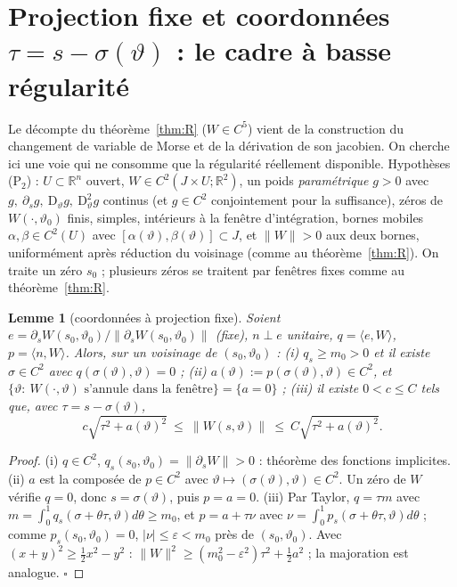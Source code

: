 \documentclass[11pt,a4paper]{article}
\newtheorem{lemme}[theoreme]{Lemme}
\theoremstyle{remark}
\newcommand{\R}{\mathbb R}
\newcommand{\vth}{\vartheta}
\newcommand{\D}{\mathrm D}
\begin{document}
\section{Projection fixe et coordonnées $\tau=s-\sigma(\vth)$ : le cadre à basse régularité}\label{sec:B}
Le décompte du théorème~\ref{thm:R} ($W\in C^5$) vient de la construction du changement de variable de Morse et de la dérivation de son jacobien. On cherche ici une voie qui ne consomme que la régularité réellement disponible. Hypothèses (P$_2$) : $U\subset\R^n$ ouvert, $W\in C^2(J\times U;\R^2)$, un poids \emph{paramétrique} $g>0$ avec $g,\ \partial_sg,\ \D_\vth g,\ \D^2_\vth g$ continus (et $g\in C^2$ conjointement pour la suffisance), zéros de $W(\cdot,\vth_0)$ finis, simples, intérieurs à la fenêtre d'intégration, bornes mobiles $\alpha,\beta\in C^2(U)$ avec $[\alpha(\vth),\beta(\vth)]\subset J$, et $\lVert W\rVert>0$ aux deux bornes, uniformément après réduction du voisinage (comme au théorème~\ref{thm:R}). On traite un zéro $s_0$ ; plusieurs zéros se traitent par fenêtres fixes comme au théorème~\ref{thm:R}.

\begin{lemme}[coordonnées à projection fixe]\label{lem:proj}
Soient $e=\partial_sW(s_0,\vth_0)/\lVert\partial_sW(s_0,\vth_0)\rVert$ (fixe), $n\perp e$ unitaire, $q=\langle e,W\rangle$, $p=\langle n,W\rangle$. Alors, sur un voisinage de $(s_0,\vth_0)$ : (i) $q_s\ge m_0>0$ et il existe $\sigma\in C^2$ avec $q(\sigma(\vth),\vth)=0$ ; (ii) $a(\vth):=p(\sigma(\vth),\vth)\in C^2$, et $\{\vth:\ W(\cdot,\vth)\text{ s'annule dans la fenêtre}\}=\{a=0\}$ ; (iii) il existe $0<c\le C$ tels que, avec $\tau=s-\sigma(\vth)$,
\[
c\sqrt{\tau^2+a(\vth)^2}\ \le\ \lVert W(s,\vth)\rVert\ \le\ C\sqrt{\tau^2+a(\vth)^2}.
\]
\end{lemme}
\begin{proof}
(i) $q\in C^2$, $q_s(s_0,\vth_0)=\lVert\partial_sW\rVert>0$ : théorème des fonctions implicites. (ii) $a$ est la composée de $p\in C^2$ avec $\vth\mapsto(\sigma(\vth),\vth)\in C^2$. Un zéro de $W$ vérifie $q=0$, donc $s=\sigma(\vth)$, puis $p=a=0$. (iii) Par Taylor, $q=\tau m$ avec $m=\int_0^1q_s(\sigma+\theta\tau,\vth)d\theta\ge m_0$, et $p=a+\tau\nu$ avec $\nu=\int_0^1p_s(\sigma+\theta\tau,\vth)d\theta$ ; comme $p_s(s_0,\vth_0)=0$, $\lvert\nu\rvert\le\varepsilon<m_0$ près de $(s_0,\vth_0)$. Avec $(x+y)^2\ge\tfrac12x^2-y^2$ : $\lVert W\rVert^2\ge(m_0^2-\varepsilon^2)\tau^2+\tfrac12a^2$ ; la majoration est analogue. $\square$
\end{proof}
\end{document}
